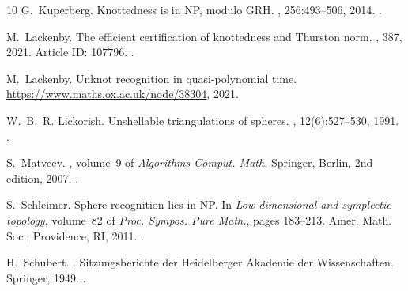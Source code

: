 \documentclass[10pt,a4paper]{amsart}
\begin{document}
\begin{thebibliography}{10}
G.~Kuperberg.
\newblock Knottedness is in {NP}, modulo {GRH}.
, 256:493--506, 2014.
\newblock \href {https://doi.org/10.1016/j.aim.2014.01.007}
  {}.

M.~Lackenby.
\newblock The efficient certification of knottedness and {Thurston} norm.
, 387, 2021.
\newblock Article ID: 107796.
\newblock \href {https://doi.org/10.1016/j.aim.2021.107796}
  {}.

M.~Lackenby.
\newblock Unknot recognition in quasi-polynomial time.
\newblock \url{https://www.maths.ox.ac.uk/node/38304}, 2021.

W.~B.~R. Lickorish.
\newblock Unshellable triangulations of spheres.
, 12(6):527--530, 1991.
\newblock \href {https://doi.org/10.1016/S0195-6698(13)80103-5}
  {}.

S.~Matveev.
,
  volume~9 of {\em Algorithms Comput. Math.}
\newblock Springer, Berlin, 2nd edition, 2007.
\newblock \href {https://doi.org/10.1007/978-3-540-45899-9}
  {}.

S.~Schleimer.
\newblock Sphere recognition lies in {NP}.
\newblock In {\em Low-dimensional and symplectic topology}, volume~82 of {\em
  Proc. Sympos. Pure Math.}, pages 183--213. Amer. Math. Soc., Providence, RI,
  2011.
\newblock \href {https://doi.org/10.1090/pspum/082/2768660}
  {}.

H.~Schubert.
.
\newblock Sitzungsberichte der Heidelberger Akademie der Wissenschaften.
  Springer, 1949.
\newblock \href {https://doi.org/10.1007/978-3-642-45813-2}
  {}.

\end{thebibliography}
\end{document}
